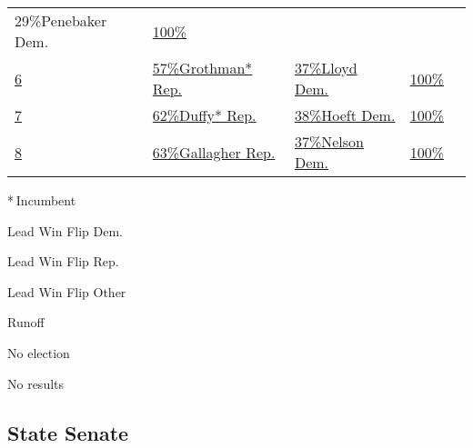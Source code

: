 \begin{longtable}[]{@{}lllll@{}}
{29\%Penebaker Dem.} &
\href{//www.nytimes3xbfgragh.onion/elections/2016/results/wisconsin-house-district-5-sensenbrenner-penebaker}{100\%}
&
\href{//www.nytimes3xbfgragh.onion/elections/2016/results/wisconsin-house-district-5-sensenbrenner-penebaker}{}\tabularnewline
\href{//www.nytimes3xbfgragh.onion/elections/2016/results/wisconsin-house-district-6-grothman-lloyd}{6}
&
\href{//www.nytimes3xbfgragh.onion/elections/2016/results/wisconsin-house-district-6-grothman-lloyd}{
57\%Grothman* Rep.} &
\href{//www.nytimes3xbfgragh.onion/elections/2016/results/wisconsin-house-district-6-grothman-lloyd}{
37\%Lloyd Dem.} &
\href{//www.nytimes3xbfgragh.onion/elections/2016/results/wisconsin-house-district-6-grothman-lloyd}{100\%}
&
\href{//www.nytimes3xbfgragh.onion/elections/2016/results/wisconsin-house-district-6-grothman-lloyd}{}\tabularnewline
\href{//www.nytimes3xbfgragh.onion/elections/2016/results/wisconsin-house-district-7-duffy-hoeft}{7}
&
\href{//www.nytimes3xbfgragh.onion/elections/2016/results/wisconsin-house-district-7-duffy-hoeft}{
62\%Duffy* Rep.} &
\href{//www.nytimes3xbfgragh.onion/elections/2016/results/wisconsin-house-district-7-duffy-hoeft}{
38\%Hoeft Dem.} &
\href{//www.nytimes3xbfgragh.onion/elections/2016/results/wisconsin-house-district-7-duffy-hoeft}{100\%}
&
\href{//www.nytimes3xbfgragh.onion/elections/2016/results/wisconsin-house-district-7-duffy-hoeft}{}\tabularnewline
\href{//www.nytimes3xbfgragh.onion/elections/2016/results/wisconsin-house-district-8-nelson-gallagher}{8}
&
\href{//www.nytimes3xbfgragh.onion/elections/2016/results/wisconsin-house-district-8-nelson-gallagher}{
63\%Gallagher Rep.} &
\href{//www.nytimes3xbfgragh.onion/elections/2016/results/wisconsin-house-district-8-nelson-gallagher}{
37\%Nelson Dem.} &
\href{//www.nytimes3xbfgragh.onion/elections/2016/results/wisconsin-house-district-8-nelson-gallagher}{100\%}
&
\href{//www.nytimes3xbfgragh.onion/elections/2016/results/wisconsin-house-district-8-nelson-gallagher}{}\tabularnewline
\bottomrule
\end{longtable}

* Incumbent~

 Lead Win Flip Dem.

 Lead Win Flip Rep.

 Lead Win Flip Other

 Runoff

 No election

 No results

\hypertarget{state-senate}{%
\subsection{State Senate}\label{state-senate}}

